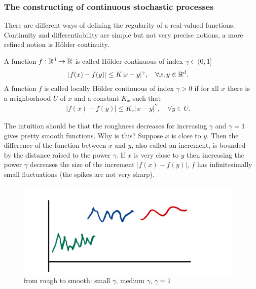 \subsubsection{The constructing of continuous stochastic processes}
There are different ways of defining the regularity of a real-valued functions. Continuity and differentiability are simple but not very precise notions, a more refined notion is H\"older continuity. 
\begin{ldef}
	\begin{deff}
		A function $f:\mathbb{R}^d\to\mathbb{R}$ is called H\"older-continuous of index $\gamma\in (0,1]$ 
		\begin{align*}
			|f(x)-f(y)|\leq K |x-y|^\gamma,\quad \forall x,y\in\mathbb{R}^d.
		\end{align*}
		A function $f$ is called locally H\"older continuous of index $\gamma>0$ if for all $x$ there is a neighborhood $U$ of $x$ and a constant $K_x$ such that 
		\begin{align*}
			|f(x)-f(y)|\leq K_x |x-y|^\gamma,\quad \forall y\in U.
		\end{align*}
	\end{deff}

\end{ldef}
The intuition should be that the roughness decreases for increasing $\gamma$ and $\gamma=1$ gives pretty smooth functions. Why is this? Suppose $x$ is close to $y$. Then the difference of the function between $x$ and $y$, also called an increment, is bounded by the distance raised to the power $\gamma$. If $x$ is very close to $y$ then increasing the power $\gamma$ decreases the size of the increment $|f(x)-f(y)|$, $f$ has infinitesimally small fluctuations (the spikes are not very sharp).
\begin{figure}[h]
	\begin{center}
		\includegraphics[scale=0.07]{rough.jpeg}
		\caption*{from rough to smooth: small $\gamma$, medium $\gamma$, $\gamma=1$}
	\end{center}
	\end{figure}
